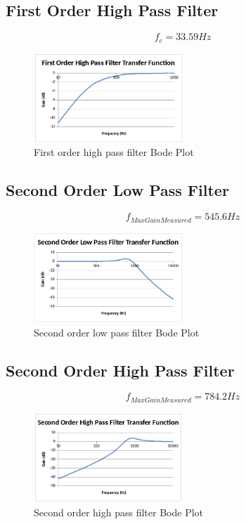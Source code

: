 \documentclass[10pt]{article}
\begin{document}
\subsection*{First Order High Pass Filter}
$$f_c = 33.59Hz$$
\begin{figure}[H]
	\centering
	\includegraphics[width=0.5\textwidth]{FirstHigh.png}
	\caption{First order high pass filter Bode Plot}
\end{figure}

\subsection*{Second Order Low Pass Filter}
$$f_{MaxGainMeasured} = 545.6 Hz$$
\begin{figure}[H]
	\centering
	\includegraphics[width=0.5\textwidth]{SecondLow.png}
	\caption{Second order low pass filter Bode Plot}
\end{figure}

\subsection*{Second Order High Pass Filter}
$$f_{MaxGainMeasured} = 784.2 Hz$$
\begin{figure}[H]
	\centering
	\includegraphics[width=0.5\textwidth]{SecondHigh.png}
	\caption{Second order high pass filter Bode Plot}
\end{figure}
\end{document}
